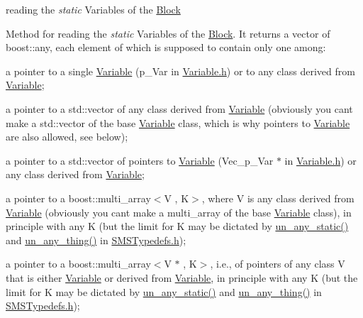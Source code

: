 reading the {\itshape static} Variables of the \mbox{\hyperlink{class_s_m_spp__di__unipi__it_1_1_block}{Block}} 

Method for reading the {\itshape static} Variables of the \mbox{\hyperlink{class_s_m_spp__di__unipi__it_1_1_block}{Block}}. It returns a vector of boost\+::any, each element of which is supposed to contain only one among\+:


\begin{DoxyItemize}
\item a pointer to a single \mbox{\hyperlink{class_s_m_spp__di__unipi__it_1_1_variable}{Variable}} (p\+\_\+\+Var in \mbox{\hyperlink{_variable_8h}{Variable.\+h}}) or to any class derived from \mbox{\hyperlink{class_s_m_spp__di__unipi__it_1_1_variable}{Variable}};
\item a pointer to a std\+::vector of any class derived from \mbox{\hyperlink{class_s_m_spp__di__unipi__it_1_1_variable}{Variable}} (obviously you can\textquotesingle{}t make a std\+::vector of the base \mbox{\hyperlink{class_s_m_spp__di__unipi__it_1_1_variable}{Variable}} class, which is why pointers to \mbox{\hyperlink{class_s_m_spp__di__unipi__it_1_1_variable}{Variable}} are also allowed, see below);
\item a pointer to a std\+::vector of pointers to \mbox{\hyperlink{class_s_m_spp__di__unipi__it_1_1_variable}{Variable}} (Vec\+\_\+p\+\_\+\+Var $\ast$ in \mbox{\hyperlink{_variable_8h}{Variable.\+h}}) or any class derived from \mbox{\hyperlink{class_s_m_spp__di__unipi__it_1_1_variable}{Variable}};
\item a pointer to a boost\+::multi\+\_\+array$<$\+V , K$>$, where V is any class derived from \mbox{\hyperlink{class_s_m_spp__di__unipi__it_1_1_variable}{Variable}} (obviously you can\textquotesingle{}t make a multi\+\_\+array of the base \mbox{\hyperlink{class_s_m_spp__di__unipi__it_1_1_variable}{Variable}} class), in principle with any K (but the limit for K may be dictated by \mbox{\hyperlink{group__boost__any__stuff_ga8ec1a694aa7a5fa58ab801c1ea419fa8}{un\+\_\+any\+\_\+static()}} and \mbox{\hyperlink{group__boost__any__stuff_gab299af634bc1ca9be3a8d45a14560036}{un\+\_\+any\+\_\+thing()}} in \mbox{\hyperlink{_s_m_s_typedefs_8h}{S\+M\+S\+Typedefs.\+h}});
\item a pointer to a boost\+::multi\+\_\+array$<$\+V $\ast$ , K$>$, i.\+e., of pointers of any class V that is either \mbox{\hyperlink{class_s_m_spp__di__unipi__it_1_1_variable}{Variable}} or derived from \mbox{\hyperlink{class_s_m_spp__di__unipi__it_1_1_variable}{Variable}}, in principle with any K (but the limit for K may be dictated by \mbox{\hyperlink{group__boost__any__stuff_ga8ec1a694aa7a5fa58ab801c1ea419fa8}{un\+\_\+any\+\_\+static()}} and \mbox{\hyperlink{group__boost__any__stuff_gab299af634bc1ca9be3a8d45a14560036}{un\+\_\+any\+\_\+thing()}} in \mbox{\hyperlink{_s_m_s_typedefs_8h}{S\+M\+S\+Typedefs.\+h}});
\end{DoxyItemize}

